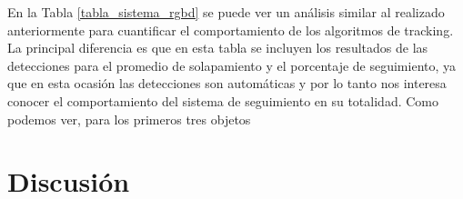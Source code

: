 En la Tabla \ref{tabla_sistema_rgbd} se puede ver un análisis similar al realizado anteriormente para cuantificar el comportamiento de los algoritmos de tracking. La principal diferencia es que en esta tabla se incluyen los resultados de las detecciones para el promedio de solapamiento y el porcentaje de seguimiento, ya que en esta ocasión las detecciones son automáticas y por lo tanto nos interesa conocer el comportamiento del sistema de seguimiento en su totalidad. Como podemos ver, para los primeros tres objetos



\section{Discusión}
